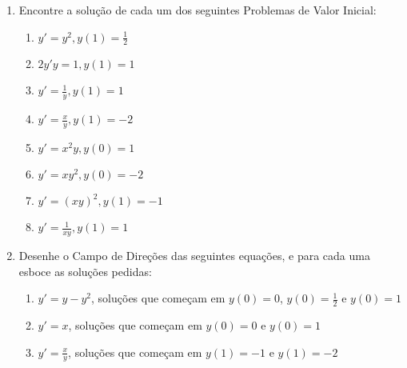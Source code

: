 \documentclass[a4paper]{article}
\begin{document}
\begin{enumerate}


\item Encontre a solução de cada um dos seguintes Problemas de Valor
  Inicial:

  \begin{enumerate}
  \item $y' = y^2, y(1)=\frac{1}{2}$
  \item $2y'y = 1, y(1)=1$
  \item $y' = \frac{1}{y}, y(1)=1$
  \item $y' = \frac{x}{y}, y(1)=-2$
  \item $y' = x^2y, y(0)=1$
  \item $y' = xy^2, y(0)=-2$
  \item $y' = (xy)^2, y(1)=-1$
  \item $y' = \frac{1}{xy}, y(1)=1$
  \end{enumerate}

\item Desenhe o Campo de Direções das seguintes equações, e para cada
  uma esboce as soluções pedidas:

  \begin{enumerate}
  \item $y' = y-y^2$, soluções que começam em $y(0)=0$,
    $y(0)=\frac{1}{2}$ e $y(0)=1$
  \item $y' = x$, soluções que começam em $y(0)=0$ e $y(0)=1$
  \item $y' = \frac{x}{y}$, soluções que começam em $y(1)=-1$ e $y(1)=-2$
  \end{enumerate}
\end{enumerate}
\end{document}
